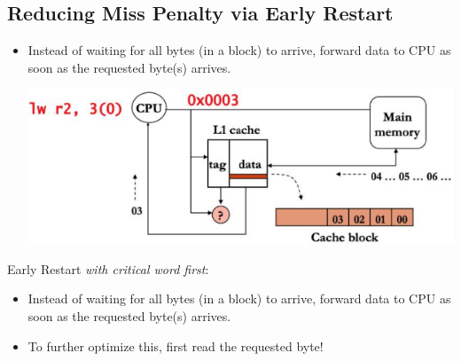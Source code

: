 \documentclass[10pt]{article}
\begin{document}
\subsection*{Reducing Miss Penalty via Early Restart}
\begin{itemize}
    \item Instead of waiting for all bytes (in a block) to arrive, forward data to CPU as soon as the requested byte(s) arrives.
    \begin{center}
        \includegraphics*[scale=1]{W7_4.png}
    \end{center}
\end{itemize}
Early Restart \textit{with critical word first}:
\begin{itemize}
    \item Instead of waiting for all bytes (in a block) to arrive, forward data to CPU as soon as the requested  byte(s) arrives.
    \item To further optimize this, first read the requested byte!
\end{itemize}
\end{document}
